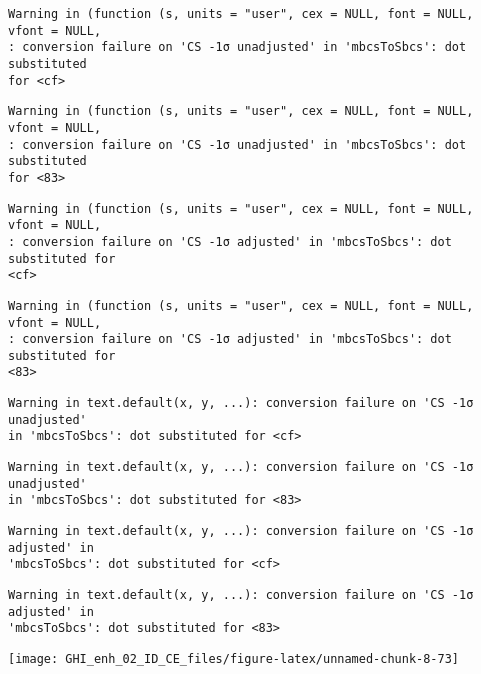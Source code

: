 \documentclass[
  10pt,
  a4paper,oneside]{article}
\begin{document}
\begin{verbatim}
Warning in (function (s, units = "user", cex = NULL, font = NULL, vfont = NULL,
: conversion failure on 'CS -1σ unadjusted' in 'mbcsToSbcs': dot substituted
for <cf>
\end{verbatim}

\begin{verbatim}
Warning in (function (s, units = "user", cex = NULL, font = NULL, vfont = NULL,
: conversion failure on 'CS -1σ unadjusted' in 'mbcsToSbcs': dot substituted
for <83>
\end{verbatim}

\begin{verbatim}
Warning in (function (s, units = "user", cex = NULL, font = NULL, vfont = NULL,
: conversion failure on 'CS -1σ adjusted' in 'mbcsToSbcs': dot substituted for
<cf>
\end{verbatim}

\begin{verbatim}
Warning in (function (s, units = "user", cex = NULL, font = NULL, vfont = NULL,
: conversion failure on 'CS -1σ adjusted' in 'mbcsToSbcs': dot substituted for
<83>
\end{verbatim}

\begin{verbatim}
Warning in text.default(x, y, ...): conversion failure on 'CS -1σ unadjusted'
in 'mbcsToSbcs': dot substituted for <cf>
\end{verbatim}

\begin{verbatim}
Warning in text.default(x, y, ...): conversion failure on 'CS -1σ unadjusted'
in 'mbcsToSbcs': dot substituted for <83>
\end{verbatim}

\begin{verbatim}
Warning in text.default(x, y, ...): conversion failure on 'CS -1σ adjusted' in
'mbcsToSbcs': dot substituted for <cf>
\end{verbatim}

\begin{verbatim}
Warning in text.default(x, y, ...): conversion failure on 'CS -1σ adjusted' in
'mbcsToSbcs': dot substituted for <83>
\end{verbatim}

\begin{center}\texttt{[image: GHI\_enh\_02\_ID\_CE\_files/figure-latex/unnamed-chunk-8-73]} \end{center}
\end{document}
